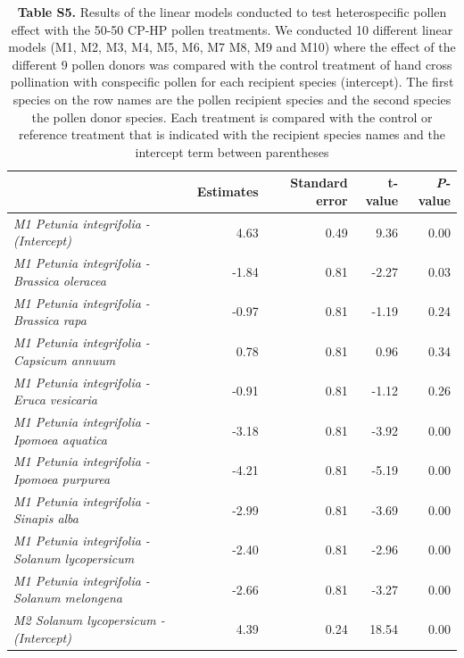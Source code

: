 \documentclass[12pt,]{article}
\begin{document}
\clearpage

\begingroup\fontsize{7}{9}\selectfont

\begin{longtable}[t]{>{\em}lrrrr}
\caption{\label{tab:unnamed-chunk-5}\textbf{Table S5.} Results of the linear models conducted to test heterospecific pollen effect with the 50-50 CP-HP pollen treatments. We conducted 10 different linear models (M1, M2, M3, M4, M5, M6, M7 M8, M9 and M10) where the effect of the different 9 pollen donors was compared with the control treatment of hand cross pollination with conspecific pollen for each recipient species (intercept). The first species on the row names are the pollen recipient species and the second species the pollen donor species. Each treatment is compared with the control or reference treatment that is indicated with the recipient species names and the intercept term between parentheses}\\
\toprule
\textbf{ } & \textbf{Estimates} & \textbf{Standard error} & \textbf{t-value} & \textbf{{\textit{P}}-value}\\
\midrule
\rowcolor{gray!6}  M1 Petunia integrifolia - (Intercept) & 4.63 & 0.49 & 9.36 & 0.00\\
\addlinespace
M1 Petunia integrifolia - Brassica oleracea & -1.84 & 0.81 & -2.27 & 0.03\\
\addlinespace
\rowcolor{gray!6}  M1 Petunia integrifolia - Brassica rapa & -0.97 & 0.81 & -1.19 & 0.24\\
\addlinespace
M1 Petunia integrifolia - Capsicum annuum & 0.78 & 0.81 & 0.96 & 0.34\\
\addlinespace
\rowcolor{gray!6}  M1 Petunia integrifolia - Eruca vesicaria & -0.91 & 0.81 & -1.12 & 0.26\\
\addlinespace
M1 Petunia integrifolia - Ipomoea aquatica & -3.18 & 0.81 & -3.92 & 0.00\\
\addlinespace
\rowcolor{gray!6}  M1 Petunia integrifolia - Ipomoea purpurea & -4.21 & 0.81 & -5.19 & 0.00\\
\addlinespace
M1 Petunia integrifolia - Sinapis alba & -2.99 & 0.81 & -3.69 & 0.00\\
\addlinespace
\rowcolor{gray!6}  M1 Petunia integrifolia - Solanum lycopersicum & -2.40 & 0.81 & -2.96 & 0.00\\
\addlinespace
M1 Petunia integrifolia - Solanum melongena & -2.66 & 0.81 & -3.27 & 0.00\\
\addlinespace
\rowcolor{gray!6}  M2 Solanum lycopersicum - (Intercept) & 4.39 & 0.24 & 18.54 & 0.00\\

\end{longtable}
\end{document}
